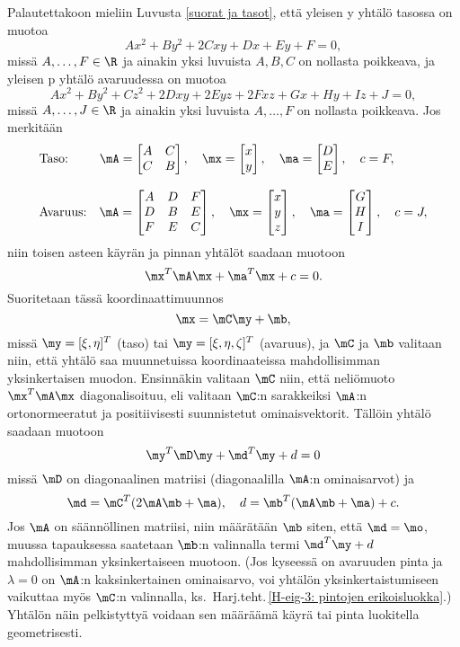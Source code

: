 Palautettakoon mieliin Luvusta \ref{suorat ja tasot}, että yleisen  
y yhtälö tasossa on muotoa
\[
Ax^2+By^2+2Cxy+Dx+Ey+F=0,
\]
missä $A,\ldots,F\in\R$ ja ainakin yksi luvuista $A,B,C$ on nollasta poikkeava, ja yleisen 
  p yhtälö avaruudessa on muotoa
\[
Ax^2+By^2+Cz^2+2Dxy+2Eyz+2Fxz+Gx+Hy+Iz+J=0,
\]
missä $A,\ldots,J\in\R$ ja ainakin yksi luvuista $A,\ldots,F$ on nollasta poikkeava. Jos 
merkitään
\begin{align*}
&\text{Taso:}\qquad\,\ \mA=\begin{bmatrix} A&C\\C&B \end{bmatrix}, \quad 
                       \mx=\begin{bmatrix} x\\y \end{bmatrix}, \quad
                       \ma=\begin{bmatrix} D\\E \end{bmatrix}, \quad c=F, \\[3mm]
&\text{Avaruus:} \quad \mA=\begin{bmatrix} A&D&F\\D&B&E\\F&E&C \end{bmatrix}, \quad 
                       \mx=\begin{bmatrix} x\\y\\z \end{bmatrix}, \quad 
                       \ma=\begin{bmatrix} G\\H\\I \end{bmatrix}, \quad c=J,
\end{align*}
niin toisen asteen käyrän ja pinnan yhtälöt saadaan muotoon
\[
\mx^T\mA\mx+\ma^T\mx+c=0.
\]
Suoritetaan tässä koordinaattimuunnos
\[
\mx=\mC\my+\mb,
\]
missä $\my=[\xi,\eta]^T$ (taso) tai $\my=[\xi,\eta,\zeta]^T$ (avaruus), ja $\mC$ ja $\mb$ 
valitaan niin, että yhtälö saa muunnetuissa koordinaateissa mahdollisimman yksinkertaisen 
muodon. Ensinnäkin valitaan $\mC$ niin, että neliömuoto $\mx^T\mA\mx$ diagonalisoituu, eli 
valitaan $\mC$:n sarakkeiksi $\mA$:n ortonormeeratut ja positiivisesti suunnistetut 
ominaisvektorit. Tällöin yhtälö saadaan muotoon
\[
\my^T\mD\my+\md^T\my+d=0
\]
missä $\mD$ on diagonaalinen matriisi (diagonaalilla $\mA$:n ominaisarvot) ja 
\[
\md=\mC^T(2\mA\mb+\ma), \quad d=\mb^T(\mA\mb+\ma)+c.
\]
Jos $\mA$ on säännöllinen matriisi, niin määrätään $\mb$ siten, että $\md=\mo$, muussa 
tapauksessa saatetaan $\mb$:n valinnalla termi $\md^T\my+d$ mahdollisimman yksinkertaiseen
muotoon. (Jos kyseessä on avaruuden pinta ja $\lambda=0$ on $\mA$:n kaksinkertainen ominaisarvo,
voi yhtälön yksinkertaistumiseen vaikuttaa myös $\mC$:n valinnalla, ks.\ 
Harj.teht.\,\ref{H-eig-3: pintojen erikoisluokka}.) Yhtälön näin pelkistyttyä voidaan sen
määräämä käyrä tai pinta luokitella geometrisesti.

